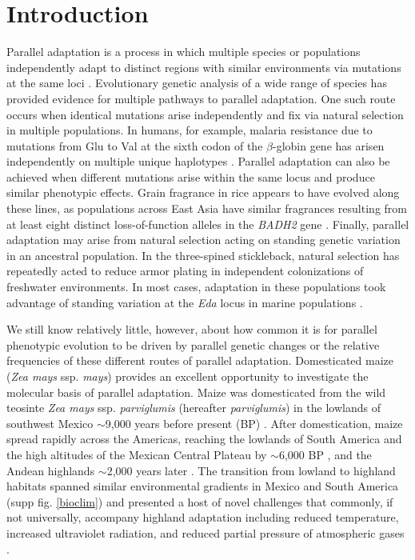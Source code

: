 \section*{Introduction}
\noindent Parallel adaptation is a process in which multiple species or populations independently adapt to distinct regions with similar environments via mutations at the same loci \cite[]{Wood_2005_15881688,Arendt_2008_18022278,Elmer_2011_21459472}.
Evolutionary genetic analysis of a wide range of species has provided evidence for multiple pathways to parallel adaptation. One such route occurs when identical mutations arise independently and fix via natural selection in multiple populations. In humans, for example, malaria resistance due to mutations from Glu to Val at the sixth codon of the $\beta$-globin gene has arisen independently on multiple unique haplotypes  \cite[]{Currat_2002_11741197,Kwiatkowski_2005_16001361}.  Parallel adaptation can also be achieved when different mutations arise within the same locus and produce similar phenotypic effects.  Grain fragrance in rice appears to have evolved along these lines, as populations across East Asia have similar fragrances resulting from at least eight distinct loss-of-function alleles in the  \emph{BADH2} gene \cite[]{Kovach_2009_19706531}.  Finally, parallel adaptation may arise from natural selection acting on standing genetic variation in an ancestral population.  In the three-spined stickleback, natural selection has repeatedly acted to reduce armor plating in independent colonizations of freshwater environments.  In most cases, adaptation in these populations took advantage of standing variation at the \emph{Eda} locus in marine populations \cite[]{Colosimo_2005_15790847}.  

We still know relatively little, however, about how common it is for parallel phenotypic evolution to be driven by parallel genetic changes 
or the relative frequencies of these different routes of parallel adaptation.
Domesticated maize (\emph{Zea mays} ssp. \emph{mays}) provides an excellent opportunity to investigate the molecular basis of parallel adaptation.  Maize was domesticated from the wild teosinte \emph{Zea mays} ssp. \emph{parviglumis} (hereafter \emph{parviglumis}) in the lowlands of southwest Mexico $\sim$9,000 years before present (BP) \cite[]{Matsuoka_2002_11983901,Piperno_2009_19307570,vanHeerwaarden_2011_21189301}. After domestication, maize spread rapidly across the Americas, reaching the lowlands of South America and the high altitudes of the Mexican Central Plateau by $\sim$6,000 BP \cite[]{Piperno_2006_69}, and the Andean highlands $\sim$2,000 years later \cite[]{Perry_2006_16511492,Grobman_2012_22307642}. 
The transition from lowland to highland habitats spanned similar environmental gradients in Mexico and South America (supp fig. \ref{bioclim}) and presented a host of novel challenges that commonly, if not universally, accompany highland adaptation including reduced temperature, increased ultraviolet radiation, and reduced partial pressure of atmospheric gases \cite[]{Korner_2007_179887}.

